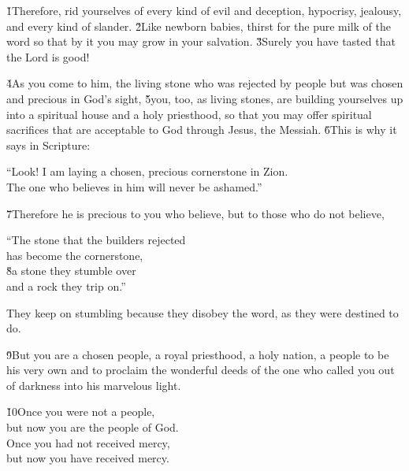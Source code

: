 \v{1}Therefore, rid yourselves of every kind of evil and deception, hypocrisy, jealousy, and every kind of slander. \v{2}Like newborn babies, thirst for the pure milk of the word so that by it you may grow in your salvation. \v{3}Surely you have tasted that the Lord is good!

\v{4}As you come to him, the living stone who was rejected by people but was chosen and precious in God's sight, \v{5}you, too, as living stones, are building yourselves up into a spiritual house and a holy priesthood, so that you may offer spiritual sacrifices that are acceptable to God through Jesus, the Messiah. \v{6}This is why it says in Scripture:

\begin{poetry}
\poeml ``Look! I am laying a chosen, precious cornerstone in Zion. \\
\poemll    The one who believes in him will never be ashamed.''
\end{poetry}

\v{7}Therefore he is precious to you who believe, but to those who do not believe,

\begin{poetry}
\poeml ``The stone that the builders rejected \\
\poemll    has become the cornerstone, \\
\poeml \v{8}a stone they stumble over \\
\poemll    and a rock they trip on.''
\end{poetry}

They keep on stumbling because they disobey the word, as they were destined to do.

\v{9}But you are a chosen people, a royal priesthood, a holy nation, a people to be his very own and to proclaim the wonderful deeds of the one who called you out of darkness into his marvelous light.

\begin{poetry}
\poeml \v{10}Once you were not a people, \\
\poemll    but now you are the people of God. \\
\poeml Once you had not received mercy, \\
\poemll    but now you have received mercy.
\end{poetry}

